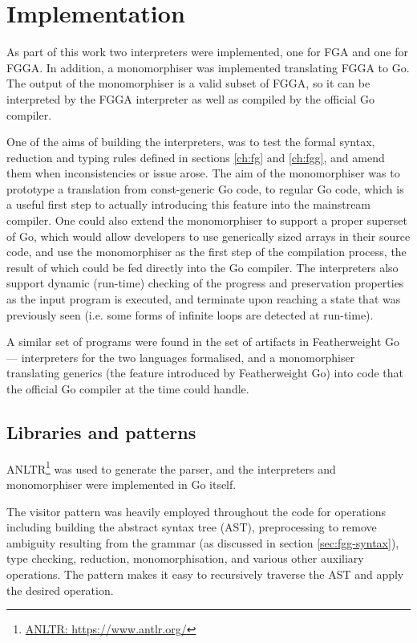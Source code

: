 \section{Implementation}
\label{ch:interpter-impl}

As part of this work two interpreters were implemented, one for FGA and one for
FGGA. In addition, a monomorphiser was implemented translating FGGA to Go. The
output of the monomorphiser is a valid subset of FGGA, so it can be interpreted
by the FGGA interpreter as well as compiled by the official Go compiler.

One of the aims of building the interpreters, was to test the formal syntax,
reduction and typing rules defined in sections \ref{ch:fg} and \ref{ch:fgg}, and
amend them when inconsistencies or issue arose. The aim of the monomorphiser was
to prototype a translation from const-generic Go code, to regular Go code, which
is a useful first step to actually introducing this feature into the mainstream
compiler. One could also extend the monomorphiser to support a proper superset
of Go, which would allow developers to use generically sized arrays in their
source code, and use the monomorphiser as the first step of the compilation
process, the result of which could be fed directly into the Go compiler. The
interpreters also support dynamic (run-time) checking of the progress and
preservation properties as the input program is executed, and terminate upon
reaching a state that was previously seen (i.e. some forms of infinite loops are
detected at run-time).

A similar set of programs were found in the set of artifacts in Featherweight Go
\autocite{fg} --- interpreters for the two languages formalised, and a
monomorphiser translating generics (the feature introduced by Featherweight Go)
into code that the official Go compiler at the time could handle.

\subsection{Libraries and patterns}

ANLTR\footnote{\href{https://www.antlr.org/}{ANLTR: https://www.antlr.org/}} was
used to generate the parser, and the interpreters and monomorphiser were
implemented in Go itself.

The visitor pattern was heavily employed throughout the code for operations
including building the abstract syntax tree (AST), preprocessing to remove
ambiguity resulting from the grammar (as discussed in section
\ref{sec:fgg-syntax}), type checking, reduction, monomorphisation, and various
other auxiliary operations. The pattern makes it easy to recursively traverse
the AST and apply the desired operation.

